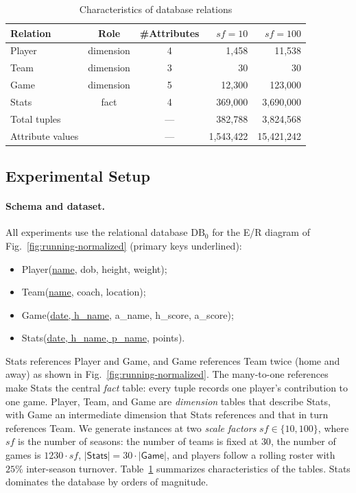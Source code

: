 \documentclass[sigconf]{acmart}
\begin{document}
\begin{table}[t]
  \centering
  \caption{Characteristics of database relations}
  \label{tab:sizes}
  \small
  \setlength{\tabcolsep}{6pt}
  \begin{tabular}{lccrr}
    \toprule
    Relation & Role & \#Attributes & $\textit{sf}{=}10$ & $\textit{sf}{=}100$ \\
    \midrule
    Player & dimension & 4 & 1,458 & 11,538 \\
    Team & dimension & 3 & 30 & 30 \\
    Game & dimension & 5 & 12,300 & 123,000 \\
    Stats & fact & 4 & 369,000 & 3,690,000 \\
    \midrule
    Total tuples & & --- & 382,788 & 3,824,568 \\
    Attribute values & & --- & 1,543,422 & 15,421,242 \\
    \bottomrule
  \end{tabular}
\end{table}
\raggedbottom


\subsection{Experimental Setup}\label{sec:exp:setup}

\paragraph{Schema and dataset.}
All experiments use the relational database $\mathrm{DB}_0$ for the E/R diagram of Fig.~\ref{fig:running-normalized} (primary keys underlined):
\begin{itemize}
  \setlength{\itemsep}{1pt}\setlength{\parsep}{0pt}\setlength{\topsep}{2pt}
  \item \textsf{Player}(\underline{name}, dob, height, weight);
  \item \textsf{Team}(\underline{name}, coach, location);
  \item \textsf{Game}(\underline{date, h\_name}, a\_name, h\_score, a\_score);
  \item \textsf{Stats}(\underline{date, h\_name, p\_name}, points).
\end{itemize}
\textsf{Stats} references \textsf{Player} and \textsf{Game}, and \textsf{Game} references \textsf{Team} twice (home and away) as shown in Fig.~\ref{fig:running-normalized}.
The many-to-one references make \textsf{Stats} the central \emph{fact} table: every tuple records one player's contribution to one game. \textsf{Player}, \textsf{Team}, and \textsf{Game} are \emph{dimension} tables that describe \textsf{Stats}, with \textsf{Game} an intermediate dimension that \textsf{Stats} references and that in turn references \textsf{Team}.
We generate instances at two \emph{scale factors} $\textit{sf}\!\in\!\{10,100\}$, where $\textit{sf}$ is the number of seasons: the number of teams is fixed at $30$, the number of games is $1230\cdot\textit{sf}$, $|\textsf{Stats}| = 30\cdot|\textsf{Game}|$, and players follow a rolling roster with $25\%$ inter-season turnover.
Table~\ref{tab:sizes} summarizes characteristics of the tables. \textsf{Stats} dominates the database by orders of magnitude.
\end{document}
